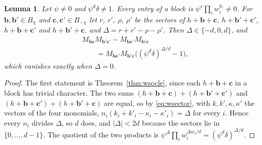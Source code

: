 \documentclass[11pt]{amsart}
\newtheorem{lemma}[theorem]{Lemma}
\theoremstyle{definition}
\theoremstyle{remark}
\newcommand{\bb}{\mathbf{b}}
\newcommand{\cc}{\mathbf{c}}
\begin{document}
\begin{lemma}\label{lem:wminor}
Let $\psi\ne0$ and $\psi^d\delta\ne1$. Every entry of a block is
$\psi^r\prod_iw_i^{k_i}\ne0$. For $\bb,\bb'\in B_\chi$ and
$\cc,\cc'\in B_{-\chi}$ let $r$, $r'$, $\rho$, $\rho'$ be the sectors of
$h+\bb+\cc$, $h+\bb'+\cc'$, $h+\bb+\cc'$ and $h+\bb'+\cc$, and
$\Delta=r+r'-\rho-\rho'$. Then $\Delta\in\{-d,0,d\}$, and
\[
\begin{aligned}
&M_{\bb\cc}M_{\bb'\cc'}-M_{\bb\cc'}M_{\bb'\cc}\\
&\qquad=M_{\bb\cc'}M_{\bb'\cc}\big((\psi^d\delta)^{\Delta/d}-1\big),
\end{aligned}
\]
which vanishes exactly when $\Delta=0$.
\end{lemma}

\begin{proof}
The first statement is Theorem~\ref{thm:wsocle}, since each
$h+\bb+\cc$ in a block has trivial character. The two sums
$(h+\bb+\cc)+(h+\bb'+\cc')$ and $(h+\bb+\cc')+(h+\bb'+\cc)$ are equal, so
by \eqref{eq:wsector}, with $k,k',\kappa,\kappa'$ the vectors of the four
monomials, $n_i(k_i+k'_i-\kappa_i-\kappa'_i)=\Delta$ for every $i$. Hence
every $n_i$ divides $\Delta$, so $d$ does, and $|\Delta|<2d$ because the
sectors lie in $\{0,\dots,d-1\}$. The quotient of the two products is
$\psi^{\Delta}\prod_iw_i^{\Delta w_i/d}=(\psi^d\delta)^{\Delta/d}$.
\end{proof}
\end{document}
